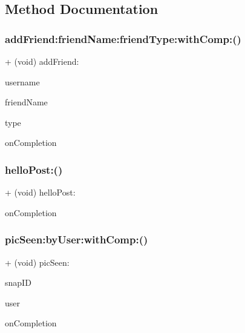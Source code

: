 \subsection{Method Documentation}
\hypertarget{interface_post_a245c914523d8fd603171547c0c82d3c5}{}\label{interface_post_a245c914523d8fd603171547c0c82d3c5} 
\subsubsection{\texorpdfstring{add\+Friend\+:friend\+Name\+:friend\+Type\+:with\+Comp\+:()}{addFriend:friendName:friendType:withComp:()}}
{\footnotesize\ttfamily + (void) add\+Friend\+: \begin{DoxyParamCaption}\item[{(N\+S\+String $\ast$)}]{username }\item[{friendName:(N\+S\+String $\ast$)}]{friend\+Name }\item[{friendType:(int)}]{type }\item[{withComp:(void($^\wedge$)(B\+O\+OL, id))}]{on\+Completion }\end{DoxyParamCaption}}

\hypertarget{interface_post_a8cb1a6ca0e1f76e9d2f98c46713c496e}{}\label{interface_post_a8cb1a6ca0e1f76e9d2f98c46713c496e} 
\subsubsection{\texorpdfstring{hello\+Post\+:()}{helloPost:()}}
{\footnotesize\ttfamily + (void) hello\+Post\+: \begin{DoxyParamCaption}\item[{(void($^\wedge$)(B\+O\+OL, id))}]{on\+Completion }\end{DoxyParamCaption}}

\hypertarget{interface_post_aed7e0dfdd2fa3c38108c08d067565740}{}\label{interface_post_aed7e0dfdd2fa3c38108c08d067565740} 
\subsubsection{\texorpdfstring{pic\+Seen\+:by\+User\+:with\+Comp\+:()}{picSeen:byUser:withComp:()}}
{\footnotesize\ttfamily + (void) pic\+Seen\+: \begin{DoxyParamCaption}\item[{(N\+S\+String $\ast$)}]{snap\+ID }\item[{byUser:(N\+S\+String $\ast$)}]{user }\item[{withComp:(void($^\wedge$)(B\+O\+OL, id))}]{on\+Completion }\end{DoxyParamCaption}}

